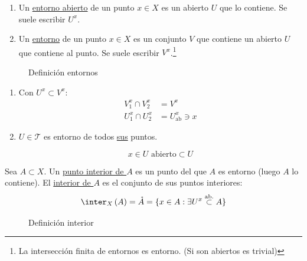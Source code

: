 \begin{defi}
\begin{enumerate}
    \item Un \underline{entorno abierto} de un punto $x \in X$ es un abierto $U$ que lo contiene. Se suele escribir $U^x$.
    \item Un \underline{entorno} de un punto $x \in X$ es un conjunto $V$ que contiene un abierto $U$ que contiene al punto. Se suele escribir $V^x$.\footnote{La intersección finita de entornos es entorno. (Si son abiertos es trivial)}
\end{enumerate}
\end{defi}
\begin{figure}[H]
    \centering
    \caption{Definición entornos}
    \label{fig:definición-entornos}
\end{figure}
\begin{obs}    
\begin{enumerate}
    \item Con $U^x \subset V^x$:
    \begin{align*}
        V_1^x \cap V_2^x &= V^x\\
        U_1^x \cap U_2^x &= U_{\text{ab}}^x \ni x
    \end{align*}

    \item $U \in \mathcal{T}$ es entorno de todos \underline{sus} puntos.
    \begin{demo}
    \[
    x \in U \text{ abierto} \subset U
    \]
    \end{demo}
\end{enumerate}
\end{obs}

\begin{defi}
Sea $A \subset X$. Un \underline{punto interior de $A$} es un punto del que $A$ es entorno (luego $A$ lo contiene). El \underline{interior de $A$} es el conjunto de sus puntos interiores:
\[
\inter_X \left( A \right) = \mathring{A} = \{x \in A: \exists U^x \stackrel{\text{ab.}}{\subset}  A\} 
\]
\end{defi}
\begin{figure}[H]
    \centering
    \caption{Definición interior}
    \label{fig:definición-interior}
\end{figure}

